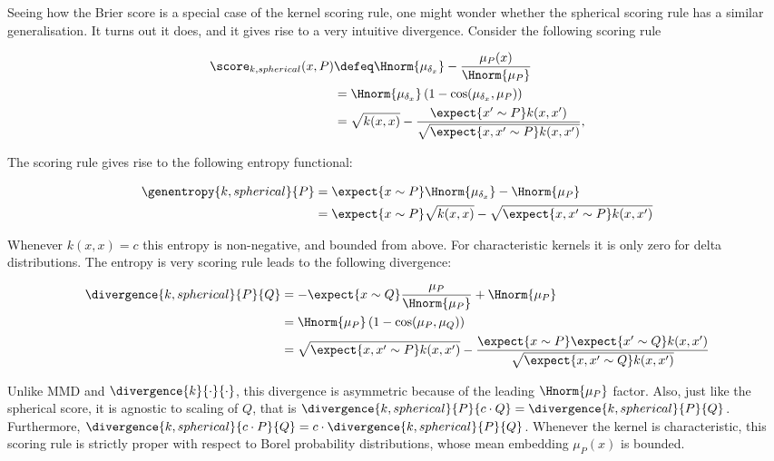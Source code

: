 Seeing how the Brier score is a special case of the kernel scoring rule, one might wonder whether the spherical scoring rule has a similar generalisation. It turns out it does, and it gives rise to a very intuitive divergence. Consider the following scoring rule

\begin{align}
	\score_{k,spherical}(x,P) &\defeq \Hnorm{\mu_{\delta_x}} - \frac{\mu_P(x)}{\Hnorm{\mu_P}}\\
			& = \Hnorm{\mu_{\delta_x}}\left(1 - \cos(\mu_{\delta_x},\mu_{P})\right)\\
		& =\sqrt{k(x,x)} - \frac{\expect{x'\sim P}k(x,x')}{\sqrt{\expect{x,x'\sim P}k(x,x')}},
\end{align}

The scoring rule gives rise to the following entropy functional:

\begin{align}
	\genentropy{k,spherical}{P} & = \expect{x\sim P}\Hnorm{\mu_{\delta_x}} - \Hnorm{\mu_P}\\
		& = \expect{x\sim P}\sqrt{k(x,x)} - \sqrt{\expect{x,x'\sim P}k(x,x')}
\end{align}

Whenever $k(x,x)=c$ this entropy is non-negative, and bounded from above. For characteristic kernels it is only zero for delta distributions. The entropy is very scoring rule leads to the following divergence:

\begin{align}
	\divergence{k,spherical}{P}{Q} &= - \expect{x\sim Q}\frac{\mu_P}{\Hnorm{\mu_P}} + \Hnorm{\mu_P}\\
		&= \Hnorm{\mu_P} \left( 1 - \cos(\mu_P, \mu_Q)\right)\\
		&= \sqrt{\expect{x,x'\sim P}k(x,x')} - \frac{\expect{x\sim P}\expect{x'\sim Q}k(x,x')}{\sqrt{\expect{x,x'\sim Q}k(x,x')}}
\end{align}

Unlike MMD and $\divergence{k}{\cdot}{\cdot}$, this divergence is asymmetric because of the leading $\Hnorm{\mu_P}$ factor. Also, just like the spherical score, it is agnostic to scaling of $Q$, that is $\divergence{k,spherical}{P}{c\cdot Q} = \divergence{k,spherical}{P}{Q}$. Furthermore, $\divergence{k,spherical}{c\cdot P}{Q} = c \cdot \divergence{k,spherical}{P}{Q}$. Whenever the kernel is characteristic, this scoring rule is strictly proper with respect to Borel probability distributions, whose mean embedding $\mu_P(x)$ is bounded.

